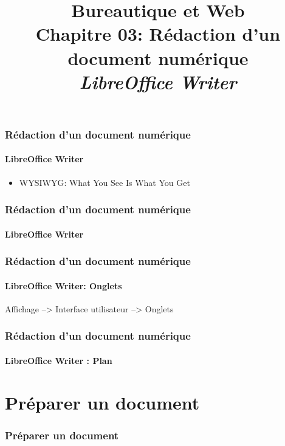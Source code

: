 \documentclass[xcolor=table]{beamer}
\title[BWEB: 03- Rédaction (LibreOffice Writer)] %
{Bureautique et Web \\Chapitre 03: Rédaction d'un document numérique \\ \slshape\small  LibreOffice Writer}
\begin{document}
\begin{frame}
\frametitle{Rédaction d'un document numérique}
\framesubtitle{LibreOffice Writer}

\begin{itemize}
	\item WYSIWYG: What You See Is What You Get
	
\end{itemize}

\end{frame}

\begin{frame}
\frametitle{Rédaction d'un document numérique}
\framesubtitle{LibreOffice Writer}

\begin{center}
\end{center}

\end{frame}

\begin{frame}
\frametitle{Rédaction d'un document numérique}
\framesubtitle{LibreOffice Writer: Onglets}
\vspace{-.7em}
Affichage --> Interface utilisateur --> Onglets

\begin{center}
\end{center}

\end{frame}

\begin{frame}
\frametitle{Rédaction d'un document numérique}
\framesubtitle{LibreOffice Writer : Plan}

\begin{multicols}{2}
	\tableofcontents
\end{multicols}
\end{frame}

\section{Préparer un document}

\begin{frame}
\frametitle{Préparer un document}

\end{frame}
\end{document}
